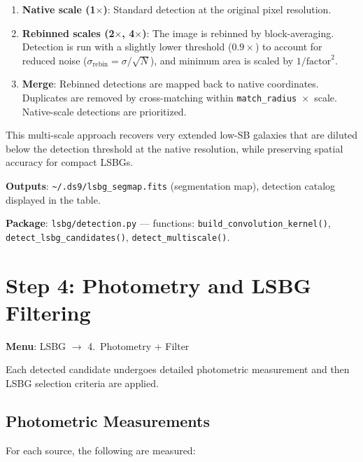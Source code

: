 \documentclass[11pt,fleqn]{book}
\begin{document}
\begin{enumerate}[leftmargin=2em]
  \item \textbf{Native scale (1$\times$)}: Standard detection at the original pixel resolution.
  \item \textbf{Rebinned scales (2$\times$, 4$\times$)}: The image is rebinned by block-averaging.  Detection is run with a slightly lower threshold ($0.9\times$) to account for reduced noise ($\sigma_\mathrm{rebin} = \sigma / \sqrt{N}$), and minimum area is scaled by $1/\mathrm{factor}^2$.
  \item \textbf{Merge}: Rebinned detections are mapped back to native coordinates.  Duplicates are removed by cross-matching within \texttt{match\_radius}~$\times$~scale.  Native-scale detections are prioritized.
\end{enumerate}

This multi-scale approach \parencite{greco2018,prole2018} recovers very extended low-SB galaxies that are diluted below the detection threshold at the native resolution, while preserving spatial accuracy for compact LSBGs.

\textbf{Outputs}: \texttt{\textasciitilde/.ds9/lsbg\_segmap.fits} (segmentation map), detection catalog displayed in the table.

\textbf{Package}: \texttt{lsbg/detection.py} --- functions: \texttt{build\_convolution\_kernel()}, \texttt{detect\_lsbg\_candidates()}, \texttt{detect\_multiscale()}.


\section{Step 4: Photometry and LSBG Filtering}
\label{sec:lsbg-phot}

\textbf{Menu}: LSBG $\to$ 4.\ Photometry + Filter

Each detected candidate undergoes detailed photometric measurement and then LSBG selection criteria are applied.

\subsection{Photometric Measurements}

For each source, the following are measured:
\end{document}

